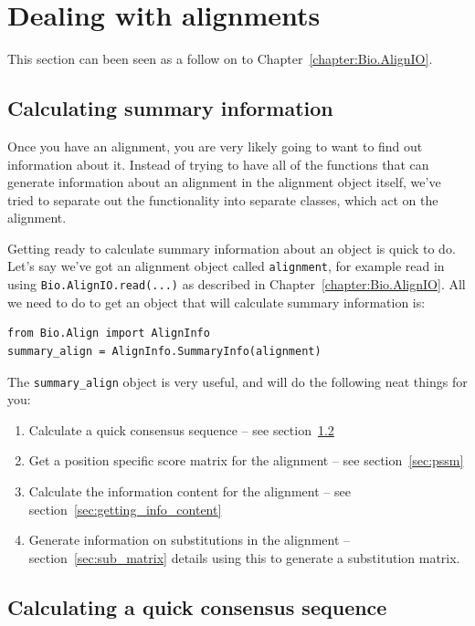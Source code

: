 \documentclass{report}
\begin{document}
\section{Dealing with alignments}

This section can been seen as a follow on to Chapter~\ref{chapter:Bio.AlignIO}.

\subsection{Calculating summary information}
\label{sec:summary_info}

Once you have an alignment, you are very likely going to want to find out information about it. Instead of trying to have all of the functions that can generate information about an alignment in the alignment object itself, we've tried to separate out the functionality into separate classes, which act on the alignment.

Getting ready to calculate summary information about an object is quick to do. Let's say we've got an alignment object called \verb|alignment|, for example read in using \verb|Bio.AlignIO.read(...)| as described in Chapter~\ref{chapter:Bio.AlignIO}. All we need to do to get an object that will calculate summary information is:

\begin{verbatim}
from Bio.Align import AlignInfo
summary_align = AlignInfo.SummaryInfo(alignment)
\end{verbatim}

The \verb|summary_align| object is very useful, and will do the following neat things for you:

\begin{enumerate}
  \item Calculate a quick consensus sequence -- see section~\ref{sec:consensus}
  \item Get a position specific score matrix for the alignment -- see section~\ref{sec:pssm}
  \item Calculate the information content for the alignment -- see section~\ref{sec:getting_info_content}
  \item Generate information on substitutions in the alignment -- section~\ref{sec:sub_matrix} details using this to generate a substitution matrix.
\end{enumerate}

\subsection{Calculating a quick consensus sequence}
\label{sec:consensus}
\end{document}
